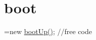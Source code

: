 \hypertarget{boot-example}{\section{boot}
}
=new \hyperlink{classboot_up}{boot\-Up()}; //free code


\begin{DoxyCodeInclude}
\end{DoxyCodeInclude}
 